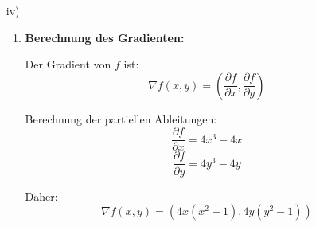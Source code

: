 {\begin{itemize}
\begin{enumerate}
Kritische Punkte treten dort auf, wo der Gradient Null ist:
\[
4x^3 - 4y = 0
\]
\[
4y^3 - 4x = 0
\]

Vereinfachung dieser Gleichungen:
\[
x^3 = y \quad \text{(1)}
\]
\[
y^3 = x \quad \text{(2)}
\]

Einsetzen von Gleichung (1) in Gleichung (2):
\[
(y^3)^3 = y \implies y^9 = y \implies y(y^8 - 1) = 0
\]

Auflösen nach $ y $:
\[
y = 0 \quad \text{oder} \quad y^8 = 1 \implies y = \pm 1
\]

Für $ y = 0 $:
\[
x^3 = 0 \implies x = 0
\]

Für $ y = 1 $:
\[
x^3 = 1 \implies x = 1
\]

Für $ y = -1 $:
\[
x^3 = -1 \implies x = -1
\]

Daher sind die kritischen Punkte $ (0, 0) $, $ (1, 1) $ und $ (-1, -1) $.

%
%
%
%
%
%
\end{enumerate}

\item[iv)]
\begin{enumerate}
\item \textbf{Berechnung des Gradienten:}

Der Gradient von $ f $ ist:
\[
\nabla f(x, y) = \left( \frac{\partial f}{\partial x}, \frac{\partial f}{\partial y} \right)
\]

Berechnung der partiellen Ableitungen:
\[
\frac{\partial f}{\partial x} = 4x^3 - 4x
\]
\[
\frac{\partial f}{\partial y} = 4y^3 - 4y
\]

Daher:
\[
\nabla f(x, y) = (4x(x^2 - 1), 4y(y^2 - 1))
\]


\end{enumerate}
\end{itemize}}
